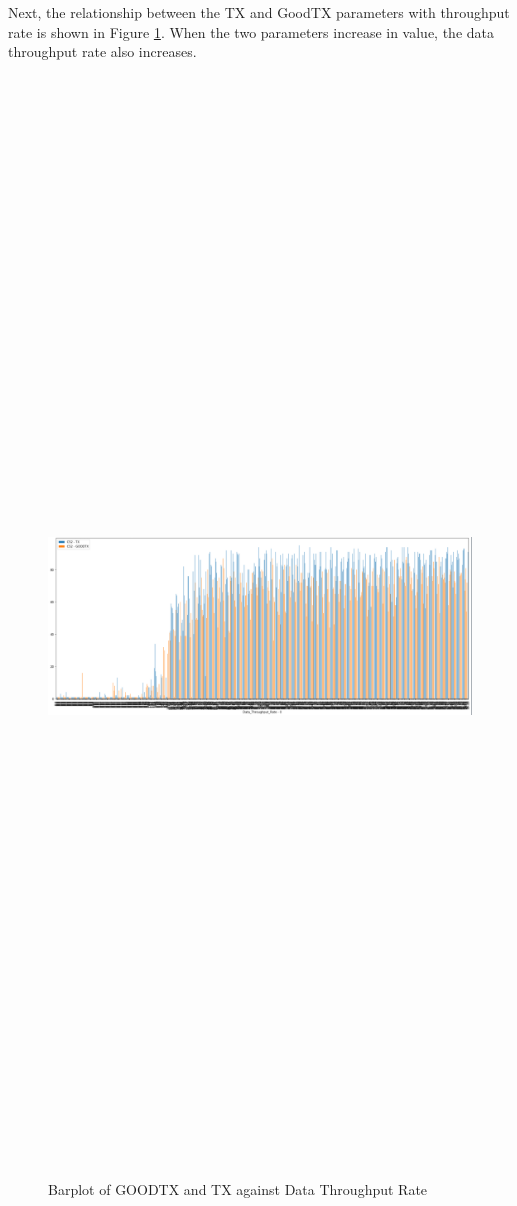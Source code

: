 Next, the relationship between the TX and GoodTX parameters with throughput rate is shown in Figure \ref{fig_bp2}. When the two parameters increase in value, the data throughput rate also increases.
\begin{figure} [ht]
    \centering
    \includegraphics[width=14.6cm,height=200.0cm,keepaspectratio]{pages/Chapter4/Chapter 4 Images/Bplot2.PNG}
    \caption{Barplot of GOODTX and TX against Data Throughput Rate}
    \label{fig_bp2}
\end{figure}

